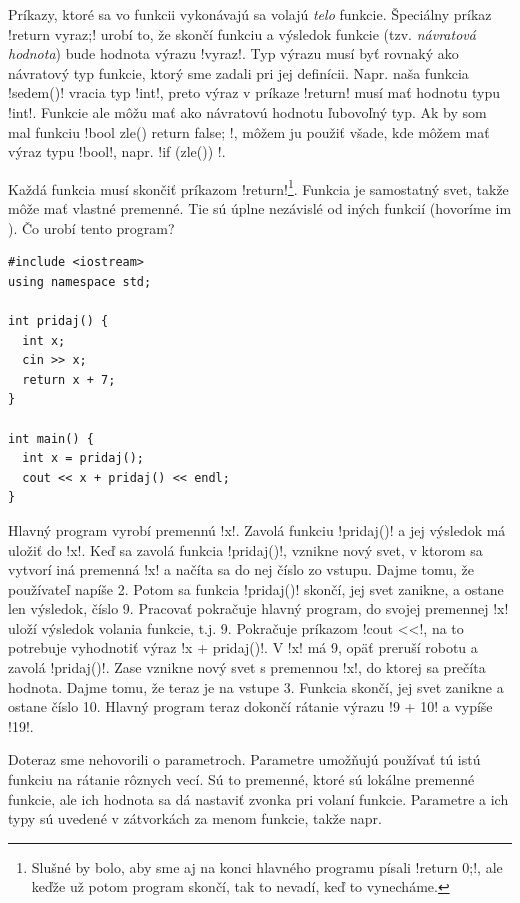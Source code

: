  Príkazy, ktoré sa vo funkcii vykonávajú sa volajú {\em telo} funkcie. Špeciálny 
príkaz \prg!return vyraz;! urobí to, že skončí funkciu a výsledok funkcie 
(tzv. {\em návratová hodnota}) bude hodnota výrazu \prg!vyraz!. Typ výrazu musí byť rovnaký
ako návratový typ funkcie, ktorý sme zadali pri jej definícii. Napr. naša funkcia
\prg!sedem()! vracia typ \prg!int!, preto výraz v príkaze \prg!return! musí mať hodnotu typu
\prg!int!. Funkcie ale môžu mať ako návratovú hodnotu ľubovoľný typ. Ak by som mal
funkciu \prg!bool zle() { return false; }!, môžem ju použiť všade, kde môžem mať výraz typu
\prg!bool!, napr. \prg!if (zle()) {}!.


Každá funkcia musí skončiť príkazom
\prg!return!\footnote{Slušné by bolo, aby sme aj na konci hlavného programu písali 
\prg!return 0;!, ale keďže už potom program skončí, tak to nevadí, keď to vynecháme.}.
Funkcia je samostatný svet, takže môže mať vlastné premenné. Tie sú úplne nezávislé
od iných funkcií (hovoríme im ). Čo urobí tento program?

\begin{lstlisting}[] 
#include <iostream>
using namespace std;

int pridaj() {
  int x;
  cin >> x;
  return x + 7;
}

int main() {
  int x = pridaj();
  cout << x + pridaj() << endl;
}
\end{lstlisting}

Hlavný program vyrobí premennú \prg!x!. Zavolá funkciu \prg!pridaj()! a jej
výsledok má uložiť do \prg!x!. Keď sa zavolá funkcia \prg!pridaj()!, vznikne 
nový svet, v ktorom sa vytvorí iná premenná \prg!x! a načíta sa do nej číslo zo vstupu.
Dajme tomu, že používateľ napíše 2.
Potom sa funkcia \prg!pridaj()! skončí, jej svet zanikne, a ostane len výsledok, číslo 9. 
Pracovať pokračuje hlavný program, do svojej premennej \prg!x! 
uloží výsledok volania funkcie, t.j. 9. Pokračuje príkazom \prg!cout <<!, 
na to potrebuje vyhodnotiť
výraz \prg!x + pridaj()!. V \prg!x! má 9, opäť preruší robotu a zavolá \prg!pridaj()!.
Zase vznikne nový svet s premennou \prg!x!, do ktorej sa prečíta hodnota. 
Dajme tomu, že teraz
je na vstupe 3. Funkcia skončí, jej svet zanikne a ostane číslo 10. Hlavný program
teraz dokončí rátanie výrazu \prg!9 + 10! a vypíše \prg!19!.


Doteraz sme nehovorili o parametroch. Parametre umožňujú používať tú istú funkciu na
rátanie rôznych vecí. Sú to premenné, ktoré sú lokálne premenné funkcie, ale
ich hodnota sa dá nastaviť zvonka pri volaní funkcie. Parametre a ich typy
sú uvedené v zátvorkách za menom funkcie, takže napr.\\

